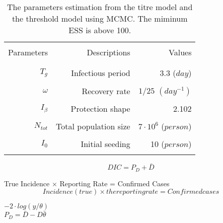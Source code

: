 \documentclass[12pt,a4paper]{article}
\begin{document}
\begin{table}[ht]
\begin{minipage}{\textwidth}     
\centering %
\caption{The parameters estimation from the titre model and the threshold model using MCMC. The miminum ESS is above 100.}
\centering %
\begin{tabular}{rrr}

\hline\hline \\%
Parameters &       Descriptions	 	&  Values \\ \\
\hline %
   \\   
   $T_g$ & 	   Infectious period 	&  	 3.3 ($day$)\\ \\
    
   $\omega$   &    Recovery rate 	&    ${1}/{25}$ $(day^{-1})$ \\ \\

   $I_\beta$ &     Protection shape & 	 2.102 \\ \\
       
   $N_{tot}$ &     Total population size  & $7\cdot10^6$ ($person$)\\ \\       
       
   $I_{0}$ &     Initial seeding &    10 ($person$)\\ \\

\hline

\end{tabular}
\end{minipage}
\end{table}
\begin{equation}
DIC=P_{D}+\bar{D}
\end{equation}

True Incidence $\times$ Reporting Rate = Confirmed Cases
\begin{equation}
  Incidence(true) \times the reporting rate = Confirmed cases
\end{equation}

 $-2\cdot log(y/\theta)$ \\
 $P_{D}=\bar{D} - D{\bar{\theta}}$
 
\end{document}
